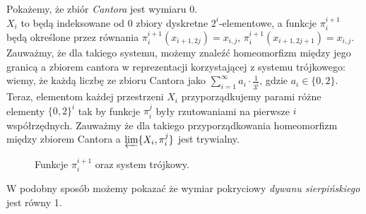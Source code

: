 \begin{przy}
    Pokażemy, że zbiór \emph{Cantora} jest wymiaru 0. \\
    $X_i$ to będą indeksowane od 0 zbiory dyskretne $2^i$-elementowe, a funkcje $\pi _i^{i+1}$ będą określone przez równania $\pi _i^{i+1}(x_{i+1, 2j})= x_{i, j}$, $\pi _i^{i+1}(x_{i+1, 2j+1})= x_{i, j}$. Zauważmy, że dla takiego systemu, możemy znaleźć homeomorfizm między jego granicą a zbiorem cantora w reprezentacji korzystającej z systemu trójkowego: wiemy, że każdą liczbę ze zbioru Cantora jako 
    $\sum _{i=1}^\infty a_i \cdot \frac{1}{3^i}$, gdzie $a_i\in \{0,2\}$. Teraz, elementom każdej przestrzeni $X_i$ przyporządkujemy parami różne elementy $\{0,2\}^i$ tak by funkcje ${\pi}_i^{j}$ były rzutowaniami na pierwsze $i$ współrzędnych. Zauważmy że dla takiego przyporządkowania homeomorfizm między zbiorem Cantora a $\varprojlim \{X_i, \pi _i^j\}$ jest trywialny.
    \begin{figure}[H]
        \centering
        
        \caption{Funkcje $\pi ^{i+1}_i $ oraz system trójkowy.}
        \label{fig:cantor}
    \end{figure}
\end{przy}

\begin{przy}
    W podobny sposób możemy pokazać że wymiar pokryciowy \emph{dywanu sierpińskiego} jest równy 1.
\end{przy}